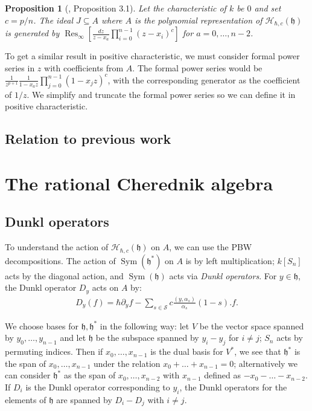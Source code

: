 \documentclass{article}
\numberwithin{equation}{section}
\newtheorem{proposition}[equation]{Proposition}
\newcommand{\Res}{\operatorname{Res}}
\newcommand{\h}{\mathfrak{h}}
\newcommand{\HH}{\mathcal{H}}
\newcommand{\Sym}{\operatorname{Sym}}
\begin{document}
\begin{proposition}[\cite{CE}, Proposition 3.1] Let the characteristic of $k$ be $0$ and set $c=p/n$. The ideal $J \subseteq A$ where $A$ is the polynomial representation of $\HH_{\hbar,c}(\h)$ is generated by $\Res_\infty\left[\frac{dz}{z-x_a} \prod_{i=0}^{n-1} (z-x_i)^c\right]$ for $a=0,\dots,n-2$.
\end{proposition}


To get a similar result in positive characteristic, we must consider formal power series in $z$ with coefficients from $A$. The formal power series would be $\frac{1}{z^{p+1}}\frac{1}{1-x_az}\prod_{j=0}^{n-1} (1-x_jz)^c$, with the corresponding generator as the coefficient of $1/z$. We simplify and truncate the formal power series so we can define it in positive characteristic.

\subsection{Relation to previous work}




 \section{The rational Cherednik algebra}
 
 \subsection{Dunkl operators}

To understand the action of $\HH_{\hbar,c}(\h)$ on $A$, we can use the PBW decompositions. The action of $\Sym(\h^*)$ on $A$ is by left multiplication; $k[S_n]$ acts by the diagonal action, and $\Sym(\h)$ acts via {\it Dunkl operators}. For $y \in \h$, the Dunkl operator $D_y$ acts on $A$ by:
\begin{align*}
D_y(f) = \hbar \partial_y f  - \sum_{s \in \mathcal{S}} c \frac{ ( y, \alpha_s )}{\alpha_s} (1-s). f.
\end{align*}

We choose bases for $\h,\h^*$ in the following way: let $V$ be the vector space spanned by $y_0,\dots,y_{n-1}$ and let $\h$ be the subspace spanned by $y_i-y_j$ for $i \ne j$; $S_n$ acts by permuting indices. Then if $x_0,\dots,x_{n-1}$ is the dual basis for $V^*$, we see that $\h^*$ is the span of $x_0,\dots,x_{n-1}$ under the relation $x_0+\dots+x_{n-1}=0$; alternatively we can consider $\h^*$ as the span of $x_0,\dots,x_{n-2}$ with $x_{n-1}$ defined as $-x_0-\dots-x_{n-2}$.  If $D_i$ is the Dunkl operator corresponding to $y_i$, the Dunkl operators for the elements of $\h$ are spanned by $D_i-D_j$ with $i \ne j$. 
\end{document}
